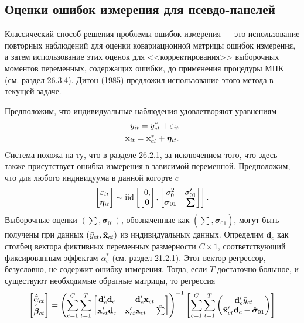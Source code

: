 \subsection{Оценки ошибок измерения для псевдо-панелей}

Классический способ решения проблемы ошибок измерения --- это использование повторных наблюдений для оценки ковариационной матрицы ошибок измерения, а затем использование этих оценок для <<корректирования>>  выборочных моментов переменных, содержащих ошибки, до применения процедуры МНК (см. раздел 26.3.4). Дитон (1985) предложил использование этого метода в текущей задаче.

Предположим, что индивидуальные наблюдения удовлетворяют уравнениям
 \begin{align}
y_{it}=y^*_{ct}+\varepsilon_{it} \nonumber \\
\mathbf{x}_{it}=\mathbf{x}^*_{ct}+\bm\eta_{it} \nonumber.
\end{align}
Cистема похожа на ту, что в разделе 26.2.1, за исключением того, что здесь также присутствует ошибка измерения в зависимой переменной. Предположим, что для любого индивидуума в данной когорте $c$ 
 \begin{align}
\begin{bmatrix}
\varepsilon_{it} \\
\bm\eta_{it}
\end{bmatrix}
\thicksim
\mathrm{iid}
\left[
\begin{bmatrix}
0, \\
\mathbf 0
\end{bmatrix}, 
\begin{bmatrix}
\sigma^2_0 & \sigma'_{01} \\
\bm\sigma_{01} & \bm\sum
\end{bmatrix}
\right].
\nonumber 
\end{align}
Выборочные оценки $(\sum, \bm\sigma_{01})$, обозначенные как $(\hat{\sum}, \bm\sigma_{01})$, могут быть получены при данных $(\bar{y}_{ct}, \bar{\mathbf{x}}_{ct})$ из индивидуальных данных. Определим $\mathbf d_c$ как столбец вектора фиктивных переменных размерности $C \times 1$, соответствующий фиксированным эффектам $\alpha^*_c$  (см. раздел 21.2.1). Этот вектор-регрессор, безусловно, не содержит ошибку измерения. Тогда, если $T$ достаточно большое, и существуют необходимые обратные матрицы, то регрессия
 \begin{align}
\begin{bmatrix}
\hat{\bar{\alpha}}_{ct} \\
\hat{\bar{\bm{\beta}}}_{ct}
\end{bmatrix}
=\left(
\sum^C_{c=1}
\sum^T_{t=1}
\begin{bmatrix}
\mathbf d'_c \mathbf d_c & \mathbf d'_c \bar{\mathbf{x}}_{ct} \\
\bar{\mathbf{x}}'_{ct} \mathbf d_c & \bar{\mathbf{x}}'_{ct} \bar{\mathbf{x}}_{ct}-\hat{\sum}
\end{bmatrix}
\right)^{-1}
\left[
\sum^C_{c=1}
\sum^T_{t=1}
\begin{pmatrix}
\mathbf d'_c \bar{y}_{ct} \\
\bar{\mathbf{x}}'_{ct} \mathbf d_c - \hat{\bm\sigma}_{01}
\end{pmatrix}
\right]
\label{Eq:22.50}
\end{align}
